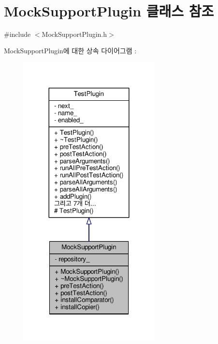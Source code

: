 \hypertarget{class_mock_support_plugin}{}\section{Mock\+Support\+Plugin 클래스 참조}
\label{class_mock_support_plugin}


{\ttfamily \#include $<$Mock\+Support\+Plugin.\+h$>$}



Mock\+Support\+Plugin에 대한 상속 다이어그램 \+: 
\nopagebreak
\begin{figure}[H]
\begin{center}
\leavevmode
\includegraphics[width=204pt]{class_mock_support_plugin__inherit__graph}
\end{center}
\end{figure}


